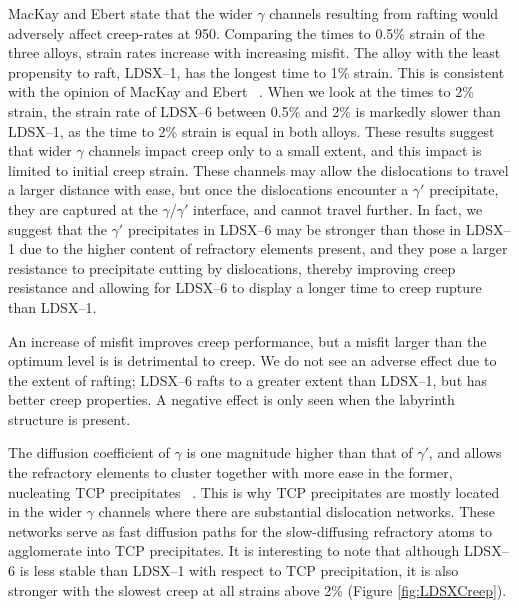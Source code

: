 MacKay and Ebert state that the wider $\gamma$ channels resulting from rafting would adversely affect creep-rates at 950\celsius.  Comparing the times to 0.5\% strain of the three alloys, strain rates increase with increasing misfit.  The alloy with the least propensity to raft, LDSX--1, has the longest time to 1\% strain.  This is consistent with the opinion of MacKay and Ebert ~\cite{mackay83}.  When we look at the times to 2\% strain, the strain rate of LDSX--6 between 0.5\% and 2\% is markedly slower than LDSX--1, as the time to 2\% strain is equal in both alloys.  These results suggest that wider $\gamma$ channels impact creep only to a small extent, and this impact is limited to initial creep strain.  These channels may allow the dislocations to travel a larger distance with ease, but once the dislocations encounter a $\gamma'$ precipitate, they are captured at the $\gamma$/$\gamma'$ interface, and cannot travel further.  In fact, we suggest that the $\gamma'$ precipitates in LDSX--6 may be stronger than those in LDSX--1 due to the higher content of refractory elements present, and they pose a larger resistance to precipitate cutting by dislocations, thereby improving creep resistance and allowing for LDSX--6 to display a longer time to creep rupture than LDSX--1.

An increase of misfit improves creep performance, but a misfit larger than the optimum level is is detrimental to creep.  We do not see an adverse effect due to the extent of rafting; LDSX--6 rafts to a greater extent than LDSX--1, but has better creep properties.  A negative effect is only seen when the labyrinth structure is present. 

The diffusion coefficient of $\gamma$ is one magnitude higher than that of $\gamma'$, and allows the refractory elements to cluster together with more ease in the former, nucleating TCP precipitates ~\cite{reed06}.  This is why TCP precipitates are mostly located in the wider $\gamma$ channels where there are substantial dislocation networks.  These networks serve as fast diffusion paths for the slow-diffusing refractory atoms to agglomerate into TCP precipitates.  It is interesting to note that although LDSX--6 is less stable than LDSX--1 with respect to TCP precipitation, it is also stronger with the slowest creep at all strains above 2\% (Figure \ref{fig:LDSXCreep}).   

